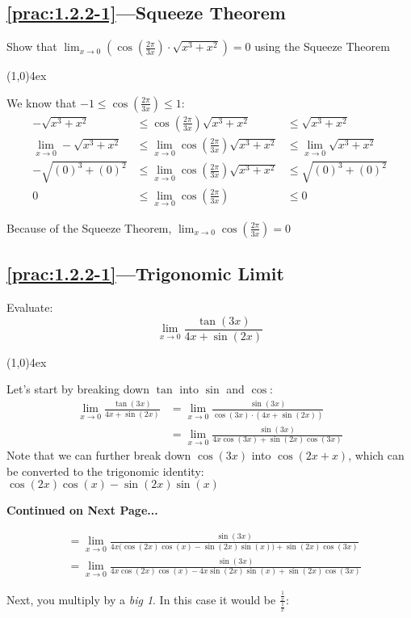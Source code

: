 \documentclass{MathNotes}
\newcommand{\br}{
\begin{center}
\line(1,0){4ex}
\end{center}}
\newcommand{\continued}{
\mbox{}
\vfill
\textbf{Continued on Next Page...}\newpage
}
\begin{document}
\subsection*{\ref{prac:1.2.2-1}---Squeeze Theorem}\label{ans:1.2.2-1}
Show that
$\displaystyle\lim_{x\to 0}(\cos(\frac{2\pi}{3x})\cdot\sqrt{x^3+x^2})=0$
using the Squeeze Theorem
\br
We know that $\displaystyle-1\leq\cos(\frac{2\pi}{3x})\leq 1$:
\begin{align*}
    -\sqrt{x^3+x^2}&\leq\cos(\frac{2\pi}{3x})\sqrt{x^3+x^2}&\leq
    \sqrt{x^3+x^2}
    \\
    \lim_{x\to 0}-\sqrt{x^3+x^2}&\leq\lim_{x\to 0}\cos(\frac{2\pi}{3x})
    \sqrt{x^3+x^2}&\leq\lim_{x\to 0}\sqrt{x^3+x^2}
    \\
    -\sqrt{(0)^3+(0)^2}&\leq\lim_{x\to 0}\cos(\frac{2\pi}{3x})
    \sqrt{x^3+x^2}&\leq\sqrt{(0)^3+(0)^2}
    \\
    0&\leq\lim_{x\to 0}\cos(\frac{2\pi}{3x})&\leq0 
\end{align*}

Because of the Squeeze Theorem, $\displaystyle\lim_{x\to 0}\cos(\frac{2\pi}{3x})=0$

\subsection*{\ref{prac:1.2.2-1}---Trigonomic Limit}\label{ans:1.2.2-2}
Evaluate:
$$\lim_{x\to 0}\frac{\tan(3x)}{4x+\sin(2x)}$$
\br

Let's start by breaking down $\tan$ into $\sin$ and $\cos$:
\begin{align*}
    \lim_{x\to 0}\frac{\tan(3x)}{4x+\sin(2x)}
    &=\lim_{x\to 0}\frac{\sin(3x)}{\cos(3x)\cdot(4x+\sin(2x))}\\
    &=\lim_{x\to 0}\frac{\sin(3x)}{4x\cos(3x)+\sin(2x)\cos(3x)}
\end{align*}
Note that we can further break down $\cos(3x)$ into $\cos(2x+x)$, which can 
be converted to the trigonomic identity:$\cos(2x)\cos(x)-\sin(2x)\sin(x)$

\continued
\begin{align*}
    &=\lim_{x\to 0}\frac{\sin(3x)}{4x\big(\cos(2x)\cos(x)-\sin(2x)\sin(x)\big)+\sin(2x)\cos(3x)}\\
    &=\lim_{x\to 0}\frac{\sin(3x)}{4x\cos(2x)\cos(x)-4x\sin(2x)\sin(x)+\sin(2x)\cos(3x)}
\end{align*}

Next, you multiply by a \textit{big 1}. In this case it would be
$\displaystyle\frac{\frac{1}{x}}{\frac{1}{x}}$:
\end{document}
